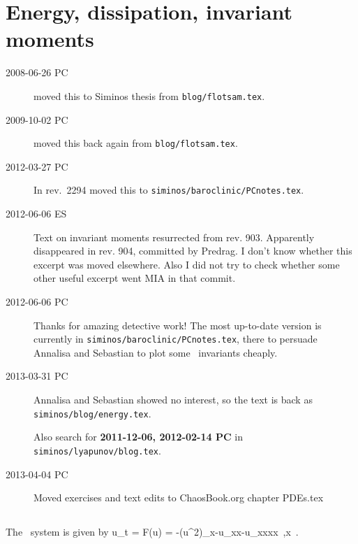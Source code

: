 
\chapter{Energy, dissipation, invariant moments}
\label{c-energy}

\renewcommand{\ssp}{x}             %

\begin{description}
\item[2008-06-26 PC] moved this to Siminos thesis from
        \texttt{blog/flotsam.tex}.
\item[2009-10-02 PC] moved this back again from
        \texttt{blog/flotsam.tex}.
\item[2012-03-27 PC] In rev.~2294 moved this to
        \texttt{siminos/baroclinic/PCnotes.tex}.
\item[2012-06-06 ES]
Text on invariant moments resurrected from rev. 903. Apparently
disappeared in rev. 904, committed by Predrag. I don't know whether this
excerpt was moved elsewhere. Also I did not try to check whether some
other useful excerpt went MIA in that commit.

\item[2012-06-06 PC] Thanks for amazing detective work! The most
up-to-date version is currently in
\texttt{siminos/baroclinic/PCnotes.tex}, there to persuade Annalisa
and Sebastian to plot some \statesp\ invariants cheaply.

\item[2013-03-31 PC] Annalisa and Sebastian showed no interest, so
the text is back as \texttt{siminos/blog/energy.tex}.

Also search for {\bf 2011-12-06, 2012-02-14 PC} in
\texttt{siminos/lyapunov/blog.tex}.

\item[2013-04-04 PC] Moved exercises and text edits to
ChaosBook.org chapter PDEs.tex

\end{description}

\section{\KSe}
\label{s-KS}

The \KS\ system is given by
\beq
  u_t = F(u) = -{\textstyle{}}(u^2)_x-u_{xx}-u_{xxxx}
    \,,\qquad   x \in [-L/2,L/2]
    \,.

